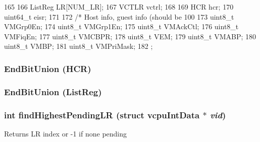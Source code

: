 \begin{DoxyCode}
165                        {
166         ListReg LR[NUM_LR];
167         VCTLR vctrl;
168 
169         HCR hcr;
170         uint64_t eisr;
171 
172         /* Host info, guest info (should be 100%
173         uint8_t VMGrp0En;
174         uint8_t VMGrp1En;
175         uint8_t VMAckCtl;
176         uint8_t VMFiqEn;
177         uint8_t VMCBPR;
178         uint8_t VEM;
179         uint8_t VMABP;
180         uint8_t VMBP;
181         uint8_t VMPriMask;
182     };
\end{DoxyCode}
\hypertarget{classVGic_ab5911b67b4abc330297af4d4c7e24204}{
\subsubsection[{EndBitUnion}]{\setlength{\rightskip}{0pt plus 5cm}EndBitUnion (HCR)}}
\label{classVGic_ab5911b67b4abc330297af4d4c7e24204}
\hypertarget{classVGic_aa0158cd1ea3c86fc81b16a8d77b8520b}{
\subsubsection[{EndBitUnion}]{\setlength{\rightskip}{0pt plus 5cm}EndBitUnion (ListReg)}}
\label{classVGic_aa0158cd1ea3c86fc81b16a8d77b8520b}
\hypertarget{classVGic_ac8cda0aa85dee9a4e2f352b46d5efea8}{
\subsubsection[{findHighestPendingLR}]{\setlength{\rightskip}{0pt plus 5cm}int findHighestPendingLR (struct vcpuIntData $\ast$ {\em vid})}}
\label{classVGic_ac8cda0aa85dee9a4e2f352b46d5efea8}
Returns LR index or -\/1 if none pending 


